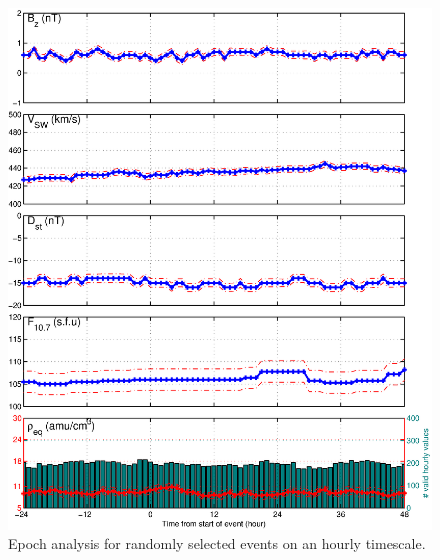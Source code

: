 \begin{figure}[htp!]
	\centering
	\includegraphics[width=1\linewidth]{Figures/StormAvs/stormavs-random-GOES6}
	\caption{Epoch analysis for randomly selected events on an hourly timescale.}
	\label{fig:EpochRandom}
\end{figure}


